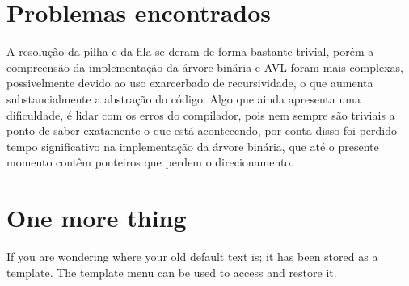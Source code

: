 \documentclass[11pt]{article}
\begin{document}
\section{Problemas encontrados}
A resolução da pilha e da fila se deram de forma bastante trivial, porém a compreensão da implementação da árvore binária e AVL foram mais complexas, possivelmente devido ao uso exarcerbado de recursividade, o que aumenta substancialmente a abstração do código. Algo que ainda apresenta uma dificuldade, é lidar com os erros do compilador, pois nem sempre são triviais a ponto de saber exatamente o que está acontecendo, por conta disso foi perdido tempo significativo na implementação da árvore binária, que até o presente momento contêm ponteiros que perdem o direcionamento.


\section{One more thing}
If you are wondering where your old default text is; it has been stored as a template. The template menu can be used to access and restore it. 
\end{document}
